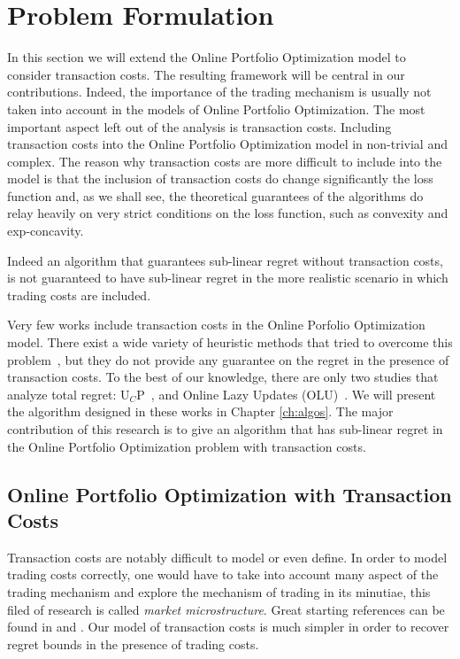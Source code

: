 \chapter{Problem Formulation}\label{ch:transaction_costs}

In this section we will extend the Online Portfolio Optimization model to consider transaction costs. The resulting framework will be central in our contributions.  
Indeed, the importance of the trading mechanism is usually not taken into account in the models of Online Portfolio Optimization.
The most important aspect left out of the analysis is transaction costs. Including transaction costs into the Online Portfolio Optimization model in non-trivial and complex. The reason why transaction costs are more difficult to include into the model is that the inclusion of transaction costs do change significantly the loss function and, as we shall see, the theoretical guarantees of the algorithms do relay heavily on very strict conditions on the loss function, such as convexity and exp-concavity.

Indeed an algorithm that guarantees sub-linear regret without transaction costs, is not guaranteed to have sub-linear regret in the more realistic scenario in which trading costs are included. 

Very few works include transaction costs in the Online Porfolio Optimization model. 
There exist a wide variety of heuristic methods that tried to overcome this problem~\cite{li2018transaction,yang2018reversion}, but they do not provide any guarantee on the regret in the presence of transaction costs. 
To the best of our knowledge, there are only two studies that analyze total regret: U$_C$P~\cite{blum1999universal}, and Online Lazy Updates (OLU)~\cite{das2013online}. We will present the algorithm designed in these works in Chapter \ref{ch:algos}. The major contribution of this research is to give an algorithm that has sub-linear regret in the Online Portfolio Optimization problem with transaction costs.

\section{Online Portfolio Optimization with Transaction Costs}

Transaction costs are notably difficult to model or even define. In order to model trading costs correctly, one would have to take into account many aspect of the trading mechanism and explore the mechanism of trading in its minutiae, this filed of research is called \emph{market microstructure}. Great starting references can be found in \cite{harris2003trading} and \cite{o1997market}. Our model of transaction costs is much simpler in order to recover regret bounds in the presence of trading costs.

